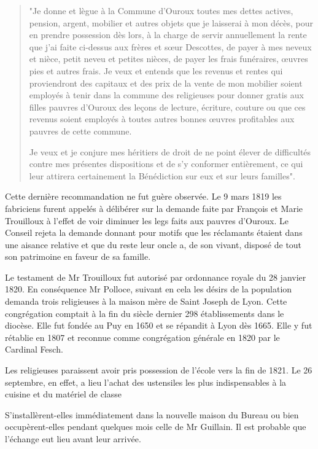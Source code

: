\begin{quote}
"Je donne et lègue à la Commune d'Ouroux toutes mes dettes actives, pension, argent, mobilier et autres objets que je laisserai à mon décès, pour en prendre possession dès lors, à la charge de servir annuellement la rente que j'ai faite ci-dessus aux frères et sœur Descottes, de payer à mes neveux et nièce, petit neveu et petites nièces, de payer les frais funéraires, œuvres pies et autres frais. Je veux et entends que les revenus et rentes qui proviendront des capitaux et des prix de la vente de mon mobilier soient employés à tenir dans la commune des religieuses pour donner gratis aux filles pauvres d'Ouroux des leçons de lecture, écriture, couture ou que ces revenus soient employés à toutes autres bonnes œuvres profitables aux pauvres de cette commune.

Je veux et je conjure mes héritiers de droit de ne point élever de difficultés contre mes présentes dispositions et de s'y conformer entièrement, ce qui leur attirera certainement la Bénédiction sur eux et sur leurs familles".
\end{quote}

Cette dernière recommandation ne fut guère observée. Le 9 mars 1819 les fabriciens furent appelés à délibérer sur la demande faite par François et Marie Trouilloux à l'effet de voir diminuer les legs faits aux pauvres d'Ouroux. Le Conseil rejeta la demande donnant pour motifs que les réclamants étaient dans une aisance relative et que du reste leur oncle a, de son vivant, disposé de tout son patrimoine en faveur de sa famille.

Le testament de Mr Trouilloux fut autorisé par ordonnance royale du 28 janvier 1820. En conséquence Mr Polloce, suivant en cela les désirs de la population demanda trois religieuses à la maison mère de Saint Joseph de Lyon. Cette congrégation comptait à la fin du siècle dernier 298 établissements dans le diocèse. Elle fut fondée au Puy en 1650 et se répandit à Lyon dès 1665. Elle y fut rétablie en 1807 et reconnue comme congrégation générale en 1820 par le Cardinal Fesch.

Les religieuses paraissent avoir pris possession de l'école vers la fin de 1821. Le 26 septembre, en effet, a lieu l'achat des ustensiles les plus indispensables à la cuisine et du matériel de classe

S'installèrent-elles immédiatement dans la nouvelle maison du Bureau ou bien occupèrent-elles pendant quelques mois celle de Mr Guillain. Il est probable que l'échange eut lieu avant leur arrivée.

